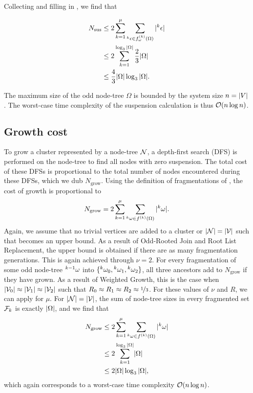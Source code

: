 Collecting  and filling in , we find that

\begin{align*}
  \nonumber N_{\text{sus}} &\leq 2\sum_{k=1}^\mu{ \sum_{  {}^{k} \epsilon \in f_\omega^{(k)}(\Omega) }{ \lvert {}^{k} \epsilon\rvert}  } \\
  \nonumber         &\leq 2\sum_{k=1}^{\log_3{\lvert\Omega\rvert}} \frac{2}{3}\lvert\Omega\rvert\\
                    &\leq \frac{4}{3}\lvert\Omega\rvert\log_3{\lvert\Omega\rvert}.
\end{align*}

The maximum size of the odd node-tree $\Omega$ is bounded by the system size $n = \lvert V\rvert$. The worst-case time complexity of the suspension calculation is thus $\mathcal{O}(n\log{n})$. 

\subsection{Growth cost}\label{sec:growthcost}

To grow a cluster represented by a node-tree $\mathcal{N}$, a depth-first search (DFS) is performed on the node-tree to find all nodes with zero suspension. The total cost of these DFSs is proportional to the total number of nodes encountered during these DFSs, which we dub $N_{\text{grow}}$. Using the definition of fragmentations of , the cost of growth is proportional to
\begin{equation}\label{eq:ngrow}
  N_{\text{grow}} = 2\sum_{k=1}^\mu{ \sum_{ \pre{k}\omega \in f^{(k)}(\Omega) }{ \abs{\pre{k}\omega}} }.
\end{equation}
Again, we assume that no trivial vertices are added to a cluster or $|\mathcal{N}| = |\mathcal{V}|$ such that  becomes an upper bound. As a result of Odd-Rooted Join and Root List Replacement, the upper bound is obtained if there are as many fragmentation generations. This is again achieved through $\nu = 2$. For every fragmentation of some odd node-tree ${}^{k-1}\omega$ into $\{{}^{k}\omega_0, {}^{k}\omega_1, {}^{k}\omega_2\}$, all three ancestors add to $N_{\text{grow}}$ if they have grown. As a result of Weighted Growth, this is the case when $\lvert\mathcal{V}_0\rvert\approx \lvert\mathcal{V}_1\rvert\approx\lvert\mathcal{V}_2\rvert$ such that $R_0 \approx R_1 \approx R_2\approx \nicefrac{1}{3}$. For these values of $\nu$ and $R$, we can apply  for $\mu$. For $|\mathcal{N}| = |\mathcal{V}|$, the sum of node-tree sizes in every fragmented set $\mathcal{F}_k$ is exactly $\lvert\Omega\rvert$, and we find that
\begin{align*}
  \nonumber N_{\text{grow}} &\leq 2\sum_{k=1}^\mu{ \sum_{  {}^{k} \omega \in f^{(k)}(\Omega) }{ \lvert {}^{k} \omega\rvert}  } \\
  \nonumber         &\leq 2\sum_{k=1}^{\log_3{\lvert\Omega\rvert}} \lvert\Omega\rvert\\
                    &\leq 2\lvert\Omega\rvert\log_3{\lvert\Omega\rvert},
\end{align*}
which again corresponds to a worst-case time complexity $\mathcal{O}(n\log{n})$.